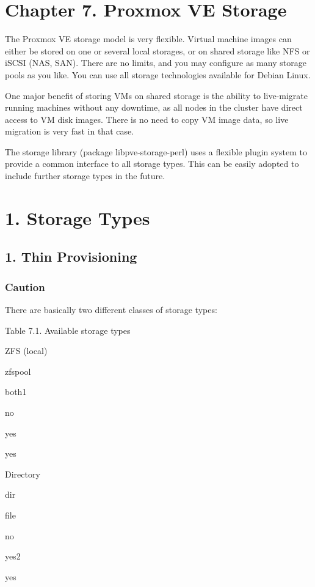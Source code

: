 \section{Chapter 7. Proxmox VE Storage}

The Proxmox VE storage model is very flexible. Virtual machine images can either be stored on one or several local storages, or on shared storage like NFS or iSCSI (NAS, SAN). There are no limits, and you may configure as many storage pools as you like. You can use all storage technologies available for Debian Linux.

One major benefit of storing VMs on shared storage is the ability to live-migrate running machines without any downtime, as all nodes in the cluster have direct access to VM disk images. There is no need to copy VM image data, so live migration is very fast in that case.

The storage library (package libpve-storage-perl) uses a flexible plugin system to provide a common interface to all storage types. This can be easily adopted to include further storage types in the future.


\section{1. Storage Types}

\subsection{1. Thin Provisioning}

\subsubsection{Caution}

There are basically two different classes of storage types:

Table 7.1. Available storage types

ZFS (local)

zfspool

both1

no

yes

yes

Directory

dir

file

no

yes2

yes

